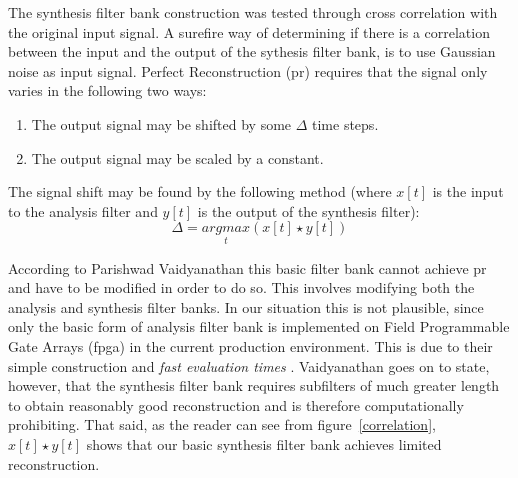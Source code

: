 \documentclass[a4paper,10pt]{article}
\begin{document}
The synthesis filter bank construction was tested through cross correlation with the original input signal. A surefire way of determining if there is a 
correlation between the input and the output of the sythesis filter bank, is to use Gaussian noise as input signal. Perfect Reconstruction (\gls{pr}) requires that the signal 
only varies in the following two ways:
\begin{enumerate}
 \item The output signal may be shifted by some $\Delta$ time steps.
 \item The output signal may be scaled by a constant.
\end{enumerate}

The signal shift may be found by the following method (where $x[t]$ is the input to the analysis filter and $y[t]$ is the output of the synthesis filter):
\begin{equation}
 \Delta=\underset{t}{argmax}(x[t]\star y[t])
\end{equation}

According to Parishwad Vaidyanathan \cite{vaidyanathan1990multirate} this basic filter bank cannot achieve \gls{pr} and have to be modified in order to do so. This involves 
modifying both the analysis and synthesis filter banks. In our situation this is not plausible, since only the basic form of analysis filter bank is implemented 
on Field Programmable Gate Arrays (\gls{fpga}) in the current production environment. This is due to their simple construction and \textit{fast evaluation times} \cite{vaidyanathan1990multirate}. 
Vaidyanathan goes on to state, however, that the synthesis filter bank requires subfilters of much greater length to obtain reasonably good reconstruction and is therefore computationally prohibiting. That 
said, as the reader can see from figure~\ref{correlation}, $x[t]\star y[t]$ shows that our basic synthesis filter bank achieves limited reconstruction.
\end{document}
